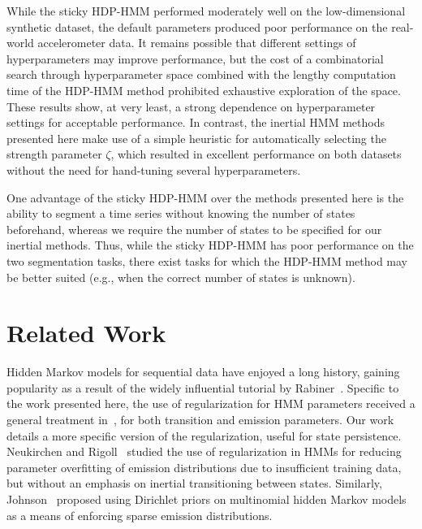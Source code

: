 \documentclass[letterpaper]{article}
\begin{document}
While the sticky HDP-HMM performed moderately well on the low-dimensional
synthetic dataset, the default parameters produced poor performance on the
real-world accelerometer data. It remains possible that different settings of
hyperparameters may improve performance, but the cost of a combinatorial search
through hyperparameter space combined with the lengthy computation time of the
HDP-HMM method prohibited exhaustive exploration of the space. These results
show, at very least, a strong dependence on hyperparameter settings for
acceptable performance. In contrast, the inertial HMM methods presented here
make use of a simple heuristic for automatically selecting the strength
parameter $\zeta$, which resulted in excellent performance on both datasets
without the need for hand-tuning several hyperparameters.

One advantage of the sticky HDP-HMM over the methods presented here is the
ability to segment a time series without knowing the number of states
beforehand, whereas we require the number of states to be specified for our
inertial methods. Thus, while the sticky HDP-HMM has poor performance on the two
segmentation tasks, there exist tasks for which the HDP-HMM method may be better
suited (e.g., when the correct number of states is unknown).

\section{Related Work}

Hidden Markov models for sequential data have enjoyed a long history, gaining
popularity as a result of the widely influential tutorial by
Rabiner~\cite{rabiner1989tutorial}. Specific to the work presented here, the use
of regularization for HMM parameters received a general treatment
in~\cite{MAP1994}, for both transition and emission parameters. Our work details
a more specific version of the regularization, useful for state persistence.
Neukirchen and Rigoll~\cite{neukirchen1999controlling} studied the use of
regularization in HMMs for reducing parameter overfitting of emission
distributions due to insufficient training data, but without an emphasis on
inertial transitioning between states. Similarly,
Johnson~\cite{Johnson07whydoesnt} proposed using Dirichlet priors on multinomial
hidden Markov models as a means of enforcing sparse emission distributions.
\end{document}
